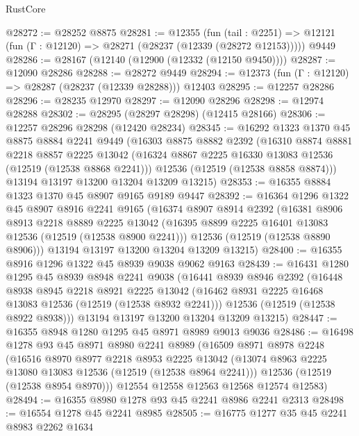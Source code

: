 \begin{lexlean}{RustCore}
\begin{coremodule}
@28272 := @28252 @8875
@28281 := @12355
    (fun (tail : @2251) => @12121 (fun (Γ : @12120) => @28271 (@28237 (@12339 (@28272 @12153)))))
    @9449
@28286 := @28167 (@12140 (@12900 (@12332 (@12150 @9450))))
@28287 := @12090 @28286
@28288 := @28272 @9449
@28294 := @12373 (fun (Γ : @12120) => @28287 (@28237 (@12339 @28288))) @12403
@28295 := @12257 @28286
@28296 := @28235 @12970
@28297 := @12090 @28296
@28298 := @12974 @28288
@28302 := @28295 (@28297 @28298) (@12415 @28166)
@28306 := @12257 @28296 @28298 (@12420 @28234)
@28345 := @16292
    @1323
    @1370
    @45
    @8875
    @8884
    @2241
    @9449
    (@16303
      @8875
      @8882
      @2392
      (@16310
        @8874
        @8881
        @2218
        @8857
        @2225
        @13042
        (@16324 @8867 @2225 @16330 @13083 @12536 (@12519 (@12538 @8868 @2241)))
        @12536
        (@12519 (@12538 @8858 @8874)))
      @13194
      @13197
      @13200
      @13204
      @13209
      @13215)
@28353 := @16355 @8884 @1323 @1370 @45 @8907 @9165 @9189 @9447
@28392 := @16364
    @1296
    @1322
    @45
    @8907
    @8916
    @2241
    @9165
    (@16374
      @8907
      @8914
      @2392
      (@16381
        @8906
        @8913
        @2218
        @8889
        @2225
        @13042
        (@16395 @8899 @2225 @16401 @13083 @12536 (@12519 (@12538 @8900 @2241)))
        @12536
        (@12519 (@12538 @8890 @8906)))
      @13194
      @13197
      @13200
      @13204
      @13209
      @13215)
@28400 := @16355 @8916 @1296 @1322 @45 @8939 @9038 @9062 @9163
@28439 := @16431
    @1280
    @1295
    @45
    @8939
    @8948
    @2241
    @9038
    (@16441
      @8939
      @8946
      @2392
      (@16448
        @8938
        @8945
        @2218
        @8921
        @2225
        @13042
        (@16462 @8931 @2225 @16468 @13083 @12536 (@12519 (@12538 @8932 @2241)))
        @12536
        (@12519 (@12538 @8922 @8938)))
      @13194
      @13197
      @13200
      @13204
      @13209
      @13215)
@28447 := @16355 @8948 @1280 @1295 @45 @8971 @8989 @9013 @9036
@28486 := @16498
    @1278
    @93
    @45
    @8971
    @8980
    @2241
    @8989
    (@16509
      @8971
      @8978
      @2248
      (@16516
        @8970
        @8977
        @2218
        @8953
        @2225
        @13042
        (@13074 @8963 @2225 @13080 @13083 @12536 (@12519 (@12538 @8964 @2241)))
        @12536
        (@12519 (@12538 @8954 @8970)))
      @12554
      @12558
      @12563
      @12568
      @12574
      @12583)
@28494 := @16355 @8980 @1278 @93 @45 @2241 @8986 @2241 @2313
@28498 := @16554 @1278 @45 @2241 @8985
@28505 := @16775 @1277 @35 @45 @2241 @8983 @2262 @1634

\end{coremodule}
\end{lexlean}
